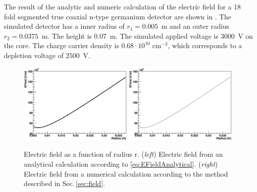 The result of the analytic and numeric calculation of the electric field for a 18 fold segmented true coaxial n-type germanium detector are shown in . The simulated detector has a inner radius of $r_{1} = 0.005$~m and an outer radius $r_{2} = 0.0375$~m. The height is $0.07$~m. The simulated applied voltage is $3000$~V on the core. The charge carrier density is $0.68\cdot 10^{10} \text{~cm}^{-3}$, which corresponds to a depletion voltage of $2500$~V.
\begin{figure}
  \centering
  \includegraphics[width=0.49\textwidth]{EFieldAnalytical.eps}
  \includegraphics[width=0.49\textwidth]{EFieldNum.eps}
  \caption{Electric field as a function of radius r. (\emph{left}) Electric field from an analytical calculation according to \eqref{eq:EFieldAnalytical}. (\emph{right}) Electric field from a numerical calculation according to the method described in Sec.\,\ref{sec:field}. }
  \label{fig:efields}
\end{figure}

